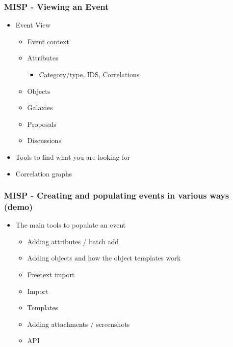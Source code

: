\begin{frame}
    \frametitle{MISP - Viewing an Event}
    \begin{itemize}
     \item Event View
        \begin{itemize}
            \item Event context
            \item Attributes
            \begin{itemize}
                \item Category/type, IDS, Correlations
            \end{itemize}
            \item Objects
            \item Galaxies
            \item Proposals
            \item Discussions
        \end{itemize}
    \item Tools to find what you are looking for
    \item Correlation graphs
    \end{itemize}
\end{frame}

\begin{frame}
    \frametitle{MISP - Creating and populating events in various ways (demo)}
    \begin{itemize}
    \item The main tools to populate an event
        \begin{itemize}
            \item Adding attributes / batch add
            \item Adding objects and how the object templates work
            \item Freetext import
            \item Import
            \item Templates
            \item Adding attachments / screenshots
            \item API
        \end{itemize}
    \end{itemize}
\end{frame}


